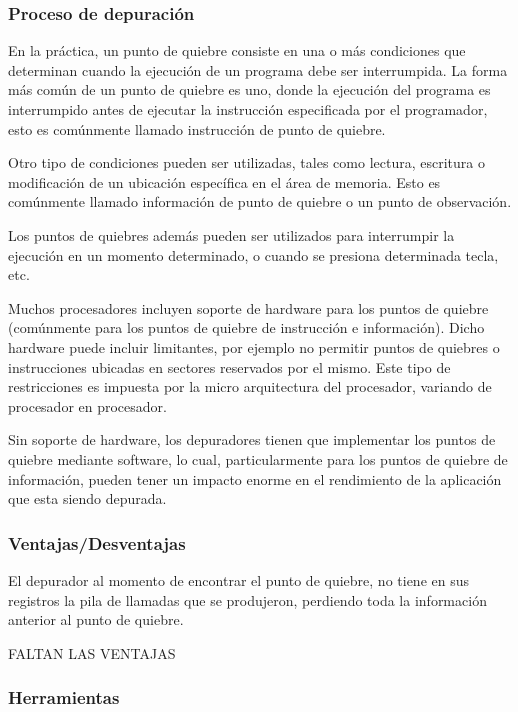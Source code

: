 \documentclass[12pt,legalpaper]{report}
\begin{document}
			\subsubsection{Proceso de depuración}

En la práctica, un punto de quiebre consiste en una o más condiciones que determinan cuando la ejecución de un programa debe ser interrumpida.  La forma más común de un punto de quiebre es uno, donde la ejecución del programa es interrumpido antes de ejecutar la instrucción especificada por el programador, esto es comúnmente llamado instrucción de punto de quiebre.

Otro tipo de condiciones pueden ser utilizadas, tales como lectura, escritura o modificación de un ubicación específica en el área de memoria.  Esto es comúnmente llamado información de punto de quiebre o un punto de observación.

Los puntos de quiebres además pueden ser utilizados para interrumpir la ejecución en un momento determinado, o cuando se presiona determinada tecla, etc.

Muchos procesadores incluyen soporte de hardware para los puntos de quiebre (comúnmente para los puntos de quiebre de instrucción e información).  Dicho hardware puede incluir limitantes, por ejemplo no permitir puntos de quiebres o instrucciones ubicadas en sectores reservados por el mismo.  Este tipo de restricciones es impuesta por la micro arquitectura del procesador, variando de procesador en procesador.

Sin soporte de hardware, los depuradores tienen que implementar los puntos de quiebre mediante software, lo cual, particularmente para los puntos de quiebre de información, pueden tener un impacto enorme en el rendimiento de la aplicación que esta siendo depurada.


			\subsubsection{Ventajas/Desventajas}

El depurador al momento de encontrar el punto de quiebre, no tiene en sus registros la pila de llamadas que se produjeron, perdiendo toda la información anterior al punto de quiebre.

FALTAN LAS VENTAJAS

			\subsubsection{Herramientas}
\end{document}
